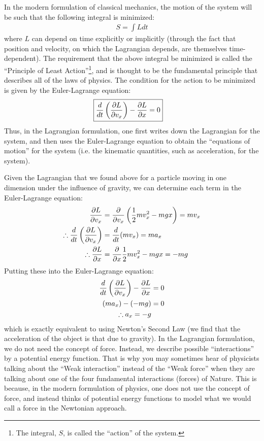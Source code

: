 In the modern formulation of classical mechanics, the motion of the system will be such that the following integral is minimized:
\begin{align*}
S = \int Ldt
\end{align*}
where $L$ can depend on time explicitly or implicitly (through the fact that position and velocity, on which the Lagrangian depends, are themselves time-dependent). The requirement that the above integral be minimized is called the ``Principle of Least Action''\footnote{The integral, $S$, is called the ``action'' of the system.}, and is thought to be the fundamental principle that describes all of the laws of physics. The condition for the action to be minimized is given by the Euler-Lagrange equation:
\begin{align}
\Aboxed{\frac{d}{dt}\left(\die{L}{v_x}\right)-\die{L}{x} = 0}
\end{align}
Thus, in the Lagrangian formulation, one first writes down the Lagrangian for the system, and then uses the Euler-Lagrange equation to obtain the ``equations of motion'' for the system (i.e. the kinematic quantities, such as acceleration, for the system). 

Given the Lagrangian that we found above for a particle moving in one dimension under the influence of gravity, we can determine each term in the Euler-Lagrange equation:
\begin{align*}
\frac{\partial L}{\partial v_x} &= \frac{\partial }{\partial v_x}\left(\frac{1}{2}mv_x^2 - mgx \right)=mv_x\\
\therefore\frac{d}{dt}\left(\frac{\partial L}{\partial v_x}\right) &= \frac{d}{dt} (mv_x) = ma_x\\
\therefore\frac{\partial L}{\partial x}&= \frac{\partial }{\partial x}\frac{1}{2}mv_x^2 - mgx = -mg\\
\end{align*}
Putting these into the Euler-Lagrange equation:
\begin{align*}
\frac{d}{dt}\left(\frac{\partial L}{\partial v_x}\right)-\frac{\partial L}{\partial x} &= 0\\
(ma_x) - (-mg) &=0\\
\therefore a_x = -g
\end{align*}
which is exactly equivalent to using Newton's Second Law (we find that the acceleration of the object is that due to gravity). In the Lagrangian formulation, we do not need the concept of force. Instead, we describe possible ``interactions'' by a potential energy function. That is why you may sometimes hear of physicists talking about the ``Weak interaction'' instead of the ``Weak force'' when they are talking about one of the four fundamental interactions (forces) of Nature. This is because, in the modern formulation of physics, one does not use the concept of force, and instead thinks of potential energy functions to model what we would call a force in the Newtonian approach.

